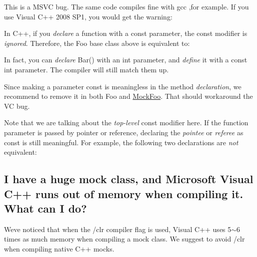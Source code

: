 This is a M\+S\+VC bug. The same code compiles fine with gcc ,for example. If you use Visual C++ 2008 S\+P1, you would get the warning\+: 
\begin{DoxyCode}{0}
\end{DoxyCode}


In C++, if you {\itshape declare} a function with a {\ttfamily const} parameter, the {\ttfamily const} modifier is {\itshape ignored}. Therefore, the {\ttfamily Foo} base class above is equivalent to\+: 
\begin{DoxyCode}{0}
\DoxyCodeLine{\};}
\end{DoxyCode}


In fact, you can {\itshape declare} Bar() with an {\ttfamily int} parameter, and {\itshape define} it with a {\ttfamily const int} parameter. The compiler will still match them up.

Since making a parameter {\ttfamily const} is meaningless in the method {\itshape declaration}, we recommend to remove it in both {\ttfamily Foo} and {\ttfamily \mbox{\hyperlink{class_mock_foo}{Mock\+Foo}}}. That should workaround the VC bug.

Note that we are talking about the {\itshape top-\/level} {\ttfamily const} modifier here. If the function parameter is passed by pointer or reference, declaring the {\itshape pointee} or {\itshape referee} as {\ttfamily const} is still meaningful. For example, the following two declarations are {\itshape not} equivalent\+: 
\begin{DoxyCode}{0}
\end{DoxyCode}


\subsection*{I have a huge mock class, and Microsoft Visual C++ runs out of memory when compiling it. What can I do?}

We\textquotesingle{}ve noticed that when the {\ttfamily /clr} compiler flag is used, Visual C++ uses 5$\sim$6 times as much memory when compiling a mock class. We suggest to avoid {\ttfamily /clr} when compiling native C++ mocks.

